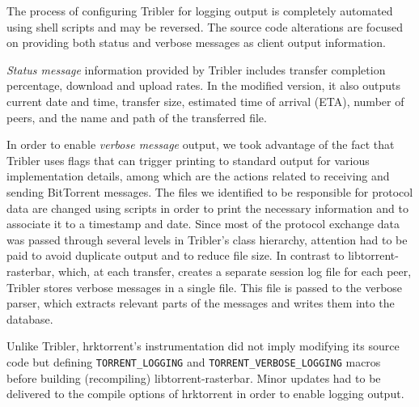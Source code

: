 The process of configuring Tribler for logging output is completely automated
using shell scripts and may be reversed. The source code alterations are
focused on providing both status and verbose messages as client output
information.

\textit{Status message} information provided by Tribler includes transfer
completion percentage, download and upload rates. In the modified version, it
also outputs current date and time, transfer size, estimated time of arrival
(ETA), number of peers, and the name and path of the transferred file.

In order to enable \textit{verbose message} output, we took advantage of the
fact that Tribler uses flags that can trigger printing to standard output for
various implementation details, among which are the actions related to
receiving and sending BitTorrent messages. The files we identified to be
responsible for protocol data are changed using scripts in order to print the
necessary information and to associate it to a timestamp and date. Since most
of the protocol exchange data was passed through several levels in Tribler's
class hierarchy, attention had to be paid to avoid duplicate output and to
reduce file size. In contrast to libtorrent-rasterbar, which, at each transfer,
creates a separate session log file for each peer, Tribler stores verbose
messages in a single file. This file is passed to the verbose parser, which
extracts relevant parts of the messages and writes them into the database.

Unlike Tribler, hrktorrent's instrumentation did not imply modifying its
source code but defining \texttt{TORRENT\_LOGGING} and
\texttt{TORRENT\_VERBOSE\_LOGGING} macros before building (recompiling)
libtorrent-rasterbar. Minor updates had to be delivered to the compile options
of hrktorrent in order to enable logging output.

